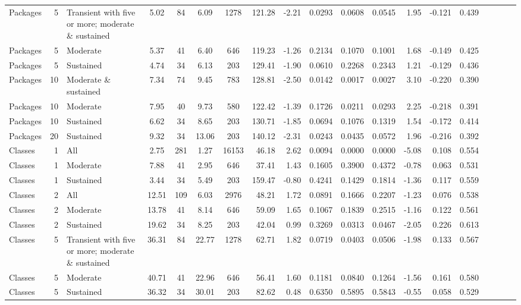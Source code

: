 \begin{table}[H]
{\begin{tabular}{l r p{4cm} c c c c r r r r r r r r r r r r}
Packages & 5 & Transient with five or more; moderate \& sustained &  5.02 & 84 & 6.09 & 1278 & 121.28 & -2.21 & 0.0293 & 0.0608 & 0.0545 & 1.95 & -0.121 & 0.439 \\ 
Packages & 5 & Moderate &  5.37 & 41 & 6.40 & 646 & 119.23 & -1.26 & 0.2134 & 0.1070 & 0.1001 & 1.68 & -0.149 & 0.425 \\ 
Packages & 5 & Sustained &  4.74 & 34 & 6.13 & 203 & 129.41 & -1.90 & 0.0610 & 0.2268 & 0.2343 & 1.21 & -0.129 & 0.436 \\ 
Packages & 10 & Moderate \& sustained &  7.34 & 74 & 9.45 & 783 & 128.81 & -2.50 & 0.0142 & 0.0017 & 0.0027 & 3.10 & -0.220 & 0.390 \\ 
Packages & 10 & Moderate &  7.95 & 40 & 9.73 & 580 & 122.42 & -1.39 & 0.1726 & 0.0211 & 0.0293 & 2.25 & -0.218 & 0.391 \\ 
Packages & 10 & Sustained &  6.62 & 34 & 8.65 & 203 & 130.71 & -1.85 & 0.0694 & 0.1076 & 0.1319 & 1.54 & -0.172 & 0.414 \\ 
Packages & 20 & Sustained &  9.32 & 34 & 13.06 & 203 & 140.12 & -2.31 & 0.0243 & 0.0435 & 0.0572 & 1.96 & -0.216 & 0.392 \\ 
Classes & 1 & All &  2.75 & 281 & 1.27 & 16153 & 46.18 & 2.62 & 0.0094 & 0.0000 & 0.0000 & -5.08 & 0.108 & 0.554 \\ 
Classes & 1 & Moderate &  7.88 & 41 & 2.95 & 646 & 37.41 & 1.43 & 0.1605 & 0.3900 & 0.4372 & -0.78 & 0.063 & 0.531 \\ 
Classes & 1 & Sustained &  3.44 & 34 & 5.49 & 203 & 159.47 & -0.80 & 0.4241 & 0.1429 & 0.1814 & -1.36 & 0.117 & 0.559 \\ 
Classes & 2 & All &  12.51 & 109 & 6.03 & 2976 & 48.21 & 1.72 & 0.0891 & 0.1666 & 0.2207 & -1.23 & 0.076 & 0.538 \\ 
Classes & 2 & Moderate &  13.78 & 41 & 8.14 & 646 & 59.09 & 1.65 & 0.1067 & 0.1839 & 0.2515 & -1.16 & 0.122 & 0.561 \\ 
Classes & 2 & Sustained &  19.62 & 34 & 8.25 & 203 & 42.04 & 0.99 & 0.3269 & 0.0313 & 0.0467 & -2.05 & 0.226 & 0.613 \\ 
Classes & 5 & Transient with five or more; moderate \& sustained &  36.31 & 84 & 22.77 & 1278 & 62.71 & 1.82 & 0.0719 & 0.0403 & 0.0506 & -1.98 & 0.133 & 0.567 \\ 
Classes & 5 & Moderate &  40.71 & 41 & 22.96 & 646 & 56.41 & 1.60 & 0.1181 & 0.0840 & 0.1264 & -1.56 & 0.161 & 0.580 \\ 
Classes & 5 & Sustained &  36.32 & 34 & 30.01 & 203 & 82.62 & 0.48 & 0.6350 & 0.5895 & 0.5843 & -0.55 & 0.058 & 0.529 \\ 

\end{tabular}}
\end{table}

